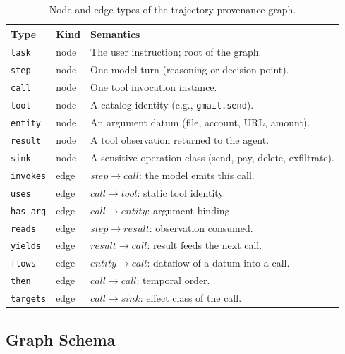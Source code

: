 \begin{table}[tb]
  \centering
  \caption{Node and edge types of the trajectory provenance graph.}
  \label{tab:schema}
  \begin{small}
  \begin{tabular}{llp{5.2cm}}
    \toprule
    \textbf{Type} & \textbf{Kind} & \textbf{Semantics} \\
    \midrule
    \texttt{task} & node & The user instruction; root of the graph. \\
    \texttt{step} & node & One model turn (reasoning or decision point). \\
    \texttt{call} & node & One tool invocation instance. \\
    \texttt{tool} & node & A catalog identity (e.g., \texttt{gmail.send}). \\
    \texttt{entity} & node & An argument datum (file, account, URL, amount). \\
    \texttt{result} & node & A tool observation returned to the agent. \\
    \texttt{sink} & node & A sensitive-operation class (send, pay, delete, exfiltrate). \\
    \midrule
    \texttt{invokes} & edge & $step \rightarrow call$: the model emits this call. \\
    \texttt{uses} & edge & $call \rightarrow tool$: static tool identity. \\
    \texttt{has\_arg} & edge & $call \rightarrow entity$: argument binding. \\
    \texttt{reads} & edge & $step \rightarrow result$: observation consumed. \\
    \texttt{yields} & edge & $result \rightarrow call$: result feeds the next call. \\
    \texttt{flows} & edge & $entity \rightarrow call$: dataflow of a datum into a call. \\
    \texttt{then} & edge & $call \rightarrow call$: temporal order. \\
    \texttt{targets} & edge & $call \rightarrow sink$: effect class of the call. \\
    \bottomrule
  \end{tabular}
  \end{small}
\end{table}

\subsection{Graph Schema}
\label{sec:method-schema}

